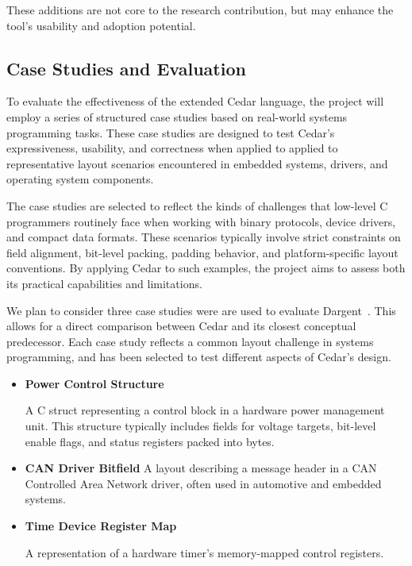 \documentclass[12pt]{article}
\begin{document}
These additions are not core to the research contribution, but may enhance the
tool's usability and adoption potential.


\subsection{Case Studies and Evaluation}
To evaluate the effectiveness of the extended Cedar language, the project will
employ a series of structured case studies based on real-world systems
programming tasks. These case studies are designed to test Cedar's 
expressiveness, usability, and correctness when applied to applied to
representative layout scenarios encountered in embedded systems, drivers,
and operating system components.

The case studies are selected to reflect the kinds of challenges that low-level
C programmers routinely face when working with binary protocols, device drivers,
and compact data formats. These scenarios typically involve strict constraints
on field alignment, bit-level packing, padding behavior, and platform-specific
layout conventions. By applying Cedar to such examples, the project aims
to assess both its practical capabilities and limitations.

We plan to consider  three case studies were are used to evaluate Dargent~\autocite{dargent}. 
This allows for a direct comparison
between Cedar and its closest conceptual predecessor. Each case study reflects
a common layout challenge in systems programming, and has been selected to test
different aspects of Cedar's design.

\begin{itemize}
    \item \textbf{Power Control Structure}
    
    A C struct representing a control block in a hardware power management unit.
    This structure typically includes fields for voltage targets, bit-level
    enable flags, and status registers packed into bytes. 
    
    \item \textbf{CAN Driver Bitfield}
    A layout describing a message header in a CAN {Controlled Area Network} driver,
    often used in automotive and embedded systems.
    \item \textbf{Time Device Register Map}
    
    A representation of a hardware timer's memory-mapped control registers.
\end{itemize}
\end{document}
